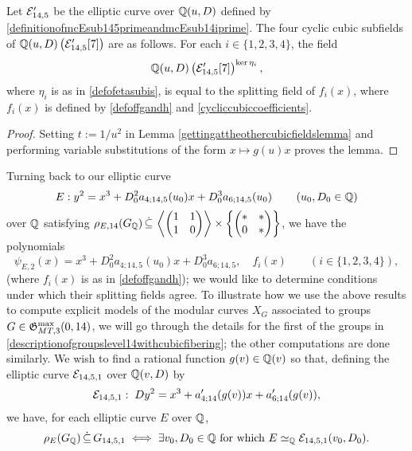 \begin{lemma} \label{explicitcubicsubfieldsatlevel7lemma}
Let $\mathcal{E}_{14,5}'$ be the elliptic curve over $\mathbb{Q}(u,D)$ defined by \eqref{definitionofmcEsub145primeandmcEsub14iprime}. 
The four cyclic cubic subfields of $\mathbb{Q}(u,D)\left( \mathcal{E}_{14,5}'[7] \right)$ are as follows. For each $i \in \{1, 2, 3, 4 \}$, the field
\[
\mathbb{Q}(u,D)\left( \mathcal{E}_{14,5}'[7] \right)^{\ker \eta_i},
\]
where $\eta_i$ is as in \eqref{defofetasubis}, is equal to the splitting field of $f_i(x)$, where $f_i(x)$ is defined by \eqref{defoffgandh} and \eqref{cycliccubiccoefficients}. 
\end{lemma}
\begin{proof}
Setting $t := 1/u^2$ in Lemma \ref{gettingattheothercubicfieldslemma} and performing variable substitutions of the form $x \mapsto g(u)x$ proves the lemma.
\end{proof}
Turning back to our elliptic curve 
\[
E : y^2 = x^3 + D_0^2 a_{4;14,5}(u_0)x + D_0^3 a_{6;14,5}(u_0) \quad\quad \left( u_0, D_0 \in \mathbb{Q} \right)
\]
over $\mathbb{Q}$ satisfying $\rho_{E,14}(G_{\mathbb{Q}}) \, \dot\subseteq \, \left\langle \begin{pmatrix} 1 & 1 \\ 1 & 0 \end{pmatrix} \right\rangle \times \left\{ \begin{pmatrix} * & * \\ 0 & * \end{pmatrix} \right\}$, we have the polynomials
\[
\psi_{E,2}(x) = x^3 + D_0^2 a_{4;14,5}(u_0)x + D_0^3a_{6;14,5}, \quad f_i(x) \quad\quad \left( i \in \{1, 2, 3, 4 \} \right),
\]
(where $f_i(x)$ is as in \eqref{defoffgandh}); we would like to determine conditions under which their splitting fields agree. 
To illustrate how we use the above results to compute explicit models of the modular curves $X_G$ associated to groups $G \in \mathfrak{G}_{MT,3}^{\max}(0,14)$, we will go through the details for the first of the groups in \eqref{descriptionofgroupslevel14withcubicfibering}; the other computations are done similarly. We wish to find a rational function $g(v) \in \mathbb{Q}(v)$ so that, defining the elliptic curve $\mathcal{E}_{14,5,1}$ over $\mathbb{Q}(v,D)$ by
\begin{equation} \label{mcE1451writtenout}
\mathcal{E}_{14,5,1} : \; Dy^2 = x^3 + a_{4;14}'(g(v)) x + a_{6;14}'(g(v)),
\end{equation}
we have, for each elliptic curve $E$ over $\mathbb{Q}$,
\[
\rho_{E}(G_{\mathbb{Q}}) \, \dot\subseteq \, G_{14,5,1} \; \Longleftrightarrow \; \exists v_0, D_0 \in \mathbb{Q} \text{ for which } E \simeq_{\mathbb{Q}} \mathcal{E}_{14,5,1}(v_0,D_0).
\]
